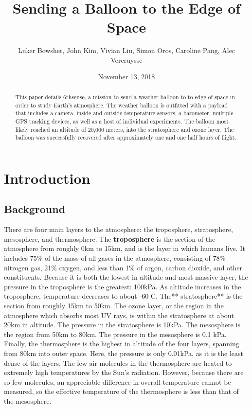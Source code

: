 \documentclass[12pt,]{article}
\title{Sending a Balloon to the Edge of Space}
\author{Luker Bowsher, John Kim, Vivian Liu, Simon Oros, Caroline Pang, Alec
Vercruysse}
\date{November 13, 2018}
\begin{document}
\maketitle
\begin{abstract}
This paper details 6thsense, a mission to send a weather balloon to to
edge of space in order to study Earth's atmosphere. The weather balloon
is outfitted with a payload that includes a camera, inside and outside
temperature sensors, a barometer, multiple GPS tracking devices, as well
as a host of individual experiments. The balloon most likely reached an
altitude of 20,000 meters, into the stratosphere and ozone layer. The
balloon was successfully recovered after approximately one and one half
hours of flight.
\end{abstract}

\newpage

\setcounter{secnumdepth}{3} \setcounter{tocdepth}{3} \tableofcontents
\newpage
\onehalfspacing

\section{Introduction}\label{introduction}

\subsection{Background}\label{background}

There are four main layers to the atmosphere: the troposphere,
stratosphere, mesosphere, and thermosphere. The \textbf{troposphere} is
the section of the atmosphere from roughly 0km to 15km, and is the layer
in which humans live. It includes 75\% of the mass of all gases in the
atmosphere, consisting of 78\% nitrogen gas, 21\% oxygen, and less than
1\% of argon, carbon dioxide, and other constituents. Because it is both
the lowest in altitude and most massive layer, the pressure in the
troposphere is the greatest: 100kPa. As altitude increases in the
troposphere, temperature decreases to about -60 \degree C. The**
stratosphere** is the section from roughly 15km to 50km. The ozone
layer, or the region in the atmosphere which absorbs most UV rays, is
within the stratosphere at about 20km in altitude. The pressure in the
stratosphere is 10kPa. The mesosphere is the region from 50km to 80km.
The pressure in the mesosphere is 0.1 kPa. Finally, the thermosphere is
the highest in altitude of the four layers, spanning from 80km into
outer space. Here, the pressure is only 0.01kPa, as it is the least
dense of the layers. The few air molecules in the thermosphere are
heated to extremely high temperatures by the Sun's radiation. However,
because there are so few molecules, an appreciable difference in overall
temperature cannot be measured, so the effective temperature of the
thermosphere is less than that of the mesosphere.
\end{document}

